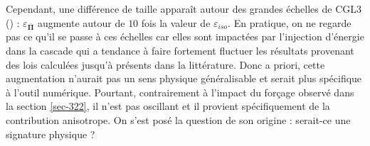 Cependant, une différence de taille apparaît autour des grandes échelles de CGL3 () : $\varepsilon_{\overline{\boldsymbol{\Pi}}}$ augmente autour de $\num{10}$ fois la valeur de $\varepsilon_{iso}$. En pratique, on ne regarde pas ce qu'il se passe à ces échelles car elles sont impactées par l'injection d'énergie dans la cascade qui a tendance à faire fortement fluctuer les résultats provenant des lois calculées jusqu'à présents dans la littérature. Donc a priori, cette augmentation n'aurait pas un sens physique généralisable et serait plus spécifique à l'outil numérique. Pourtant, contrairement à l'impact du forçage observé dans la section \ref{sec-322}, il n'est pas oscillant et il provient spécifiquement de la contribution anisotrope. On s'est posé la question de son origine : serait-ce une signature physique ? 

